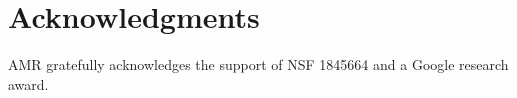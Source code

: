 \documentclass[11pt,a4paper]{article}
\begin{document}
\section*{Acknowledgments}

AMR gratefully acknowledges the support of NSF 1845664 and a Google research award. 










\end{document}
